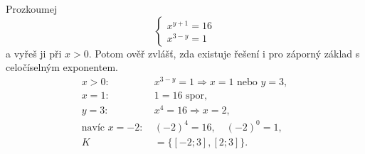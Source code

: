 \documentclass[11pt,a4paper]{article}
\begin{document}
\begin{zadaniReseniBox}[title={Rozšíření 1}]
Prozkoumej \[
\begin{cases}x^{y+1}=16\\x^{3-y}=1\end{cases}
\] a vyřeš ji při $x>0$. Potom ověř zvlášť, zda existuje řešení i pro záporný základ s celočíselným exponentem.
\tcblower
\[
\begin{aligned}x>0:\ &x^{3-y}=1\Rightarrow x=1\text{ nebo }y=3,\\x=1:\ &1=16\text{ spor},\\y=3:\ &x^4=16\Rightarrow x=2,\\\text{navíc }x=-2:\ &(-2)^4=16,\quad(-2)^0=1,\\K&=\{[-2;3],[2;3]\}.\end{aligned}
\]
\end{zadaniReseniBox}
\end{document}
